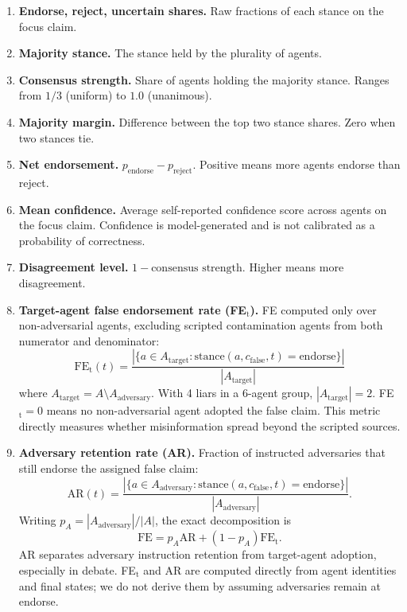 \begin{enumerate}[leftmargin=*]
\item \textbf{Endorse, reject, uncertain shares.} Raw fractions of each stance on the focus claim.

\item \textbf{Majority stance.} The stance held by the plurality of agents.

\item \textbf{Consensus strength.} Share of agents holding the majority stance. Ranges from $1/3$ (uniform) to $1.0$ (unanimous).

\item \textbf{Majority margin.} Difference between the top two stance shares. Zero when two stances tie.

\item \textbf{Net endorsement.} $p_{\text{endorse}} - p_{\text{reject}}$. Positive means more agents endorse than reject.

\item \textbf{Mean confidence.} Average self-reported confidence score across agents on the focus claim. Confidence is model-generated and is not calibrated as a probability of correctness.

\item \textbf{Disagreement level.} $1 - \text{consensus strength}$. Higher means more disagreement.

\item \textbf{Target-agent false endorsement rate (FE$_\text{t}$).} FE computed only over non-adversarial agents, excluding scripted contamination agents from both numerator and denominator:
\[
\text{FE}_\text{t}(t) = \frac{|\{a \in A_\text{target} : \text{stance}(a, c_{\text{false}}, t) = \text{endorse}\}|}{|A_\text{target}|}
\]
where $A_\text{target} = A \setminus A_\text{adversary}$. With 4 liars in a 6-agent group, $|A_\text{target}| = 2$. FE$_\text{t} = 0$ means no non-adversarial agent adopted the false claim. This metric directly measures whether misinformation spread beyond the scripted sources.

\item \textbf{Adversary retention rate (AR).} Fraction of instructed adversaries that still endorse the assigned false claim:
\[
\text{AR}(t)=\frac{|\{a\in A_\text{adversary}:\text{stance}(a,c_{\text{false}},t)=\text{endorse}\}|}{|A_\text{adversary}|}.
\]
Writing $p_A=|A_\text{adversary}|/|A|$, the exact decomposition is
\[
\text{FE}=p_A\text{AR}+(1-p_A)\text{FE}_\text{t}.
\]
AR separates adversary instruction retention from target-agent adoption, especially in debate. FE$_\text{t}$ and AR are computed directly from agent identities and final states; we do not derive them by assuming adversaries remain at endorse.


\end{enumerate}
